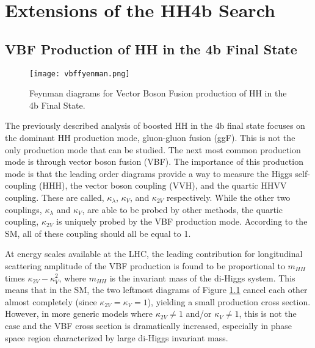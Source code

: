 \chapter{Extensions of the HH4b Search}
\label{chap:eight}



\section{VBF Production of HH in the 4b Final State \label{s:vbf}}

\begin{figure} %
    \centering
    \texttt{[image: vbffyenman.png]}
    \caption{Feynman diagrams for Vector Boson Fusion production of HH in the 4b Final State.}
    \label{fig:vbffeynman}
 \end{figure}


The previously described analysis of boosted HH in the 4b final state focuses on the dominant HH production mode, gluon-gluon fusion (ggF).
This is not the only production mode that can be studied. The next most common production mode is through vector boson fusion (VBF).
The importance of this production mode is that the leading order diagrams provide a way to measure the Higgs self-coupling (HHH), the vector boson coupling (VVH), and the quartic HHVV coupling.
These are called, $\kappa_{\lambda}$, $\kappa_V$, and $\kappa_{2V}$ respectively.
While the other two couplings, $\kappa_{\lambda}$ and $\kappa_V$, are able to be probed by other methods, the quartic coupling, $\kappa_{2V}$ is uniquely probed by the VBF production mode.
According to the SM, all of these coupling should all be equal to 1.

At energy scales available at the LHC, the leading contribution for longitudinal scattering amplitude of the VBF production is found to be proportional to $m_{HH}$ times $\kappa_{2V} - \kappa_V^2$, where $m_{HH}$ is the invariant mass of the di-Higgs system. 
This means that in the SM, the two leftmost diagrams of Figure \ref{fig:vbffeynman} cancel each other almost completely (since $\kappa_{2V} = \kappa_V = 1$), yielding a small production cross section. 
However, in more generic models where $\kappa_{2V} \neq 1$ and/or $\kappa_V \neq 1$, this is not the case and the VBF cross section is dramatically increased, especially in phase space region characterized by large di-Higgs invariant mass. 

